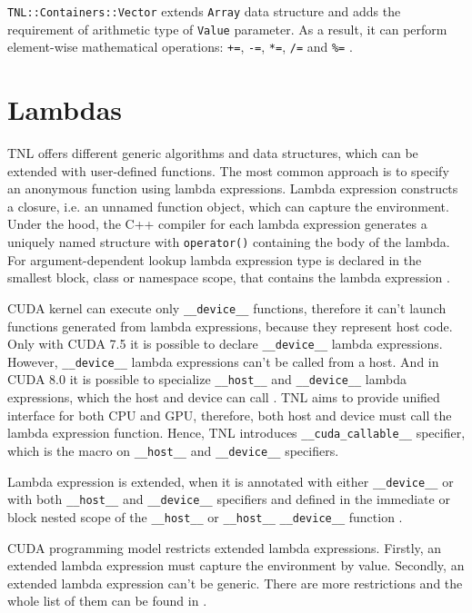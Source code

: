 \texttt{TNL::Containers::Vector} extends \texttt{Array} data structure and adds the requirement of arithmetic type of \texttt{Value} parameter.
As a result, it can perform element-wise mathematical operations: \texttt{+=}, \texttt{-=}, \texttt{*=}, \texttt{/=} and \texttt{\%=} \cite{TNLVector}.

\section{Lambdas} \label{sec:lambdas}

TNL offers different generic algorithms and data structures, which can be extended with user-defined functions.
The most common approach is to specify an anonymous function using lambda expressions.
Lambda expression constructs a closure, i.e. an unnamed function object, which can capture the environment.
Under the hood, the C++ compiler for each lambda expression generates a uniquely named structure with \texttt{operator()} containing the body of the lambda.
For argument-dependent lookup lambda expression type is declared in the smallest block, class or namespace scope, that contains the lambda expression \cite{LambdaCPP}.

CUDA kernel can execute only \texttt{\_\_device\_\_} functions, therefore it can't launch functions generated from lambda expressions, because they represent host code.
Only with CUDA 7.5 it is possible to declare \texttt{\_\_device\_\_} lambda expressions.
However, \texttt{\_\_device\_\_} lambda expressions can't be called from a host.
And in CUDA 8.0 it is possible to specialize \texttt{\_\_host\_\_} and \texttt{\_\_device\_\_} lambda expressions, which the host and device can call \cite{CUDA8}.
TNL aims to provide unified interface for both CPU and GPU, therefore, both host and device must call the lambda expression function.
Hence, TNL introduces \texttt{\_\_cuda\_callable\_\_} specifier, which is the macro on \texttt{\_\_host\_\_} and \texttt{\_\_device\_\_} specifiers.

\begin{definition}
  Lambda expression is extended, when it is annotated with either \texttt{\_\_device\_\_} or with both \texttt{\_\_host\_\_} and \texttt{\_\_device\_\_} specifiers
  and defined in the immediate or block nested scope of the \texttt{\_\_host\_\_} or \texttt{\_\_host\_\_} \texttt{\_\_device\_\_} function \cite{CUDAProgramming}.
\end{definition}

CUDA programming model restricts extended lambda expressions.
Firstly, an extended lambda expression must capture the environment by value.
Secondly, an extended lambda expression can't be generic.
There are more restrictions and the whole list of them can be found in \cite{CUDAProgramming}.

